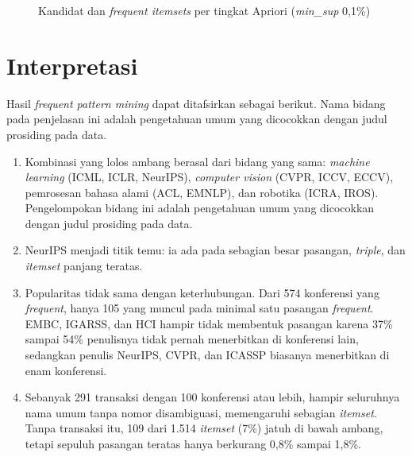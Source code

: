 \begin{figure}[!htb]
\centering
{}
\caption{Kandidat dan \textit{frequent itemsets} per tingkat Apriori (\textit{min\_sup} 0,1\%)}
\label{fig:t4-apriori-kandidat}
\end{figure}

\section{Interpretasi}
\label{sec:hasil-t4-interpretasi}
Hasil \textit{frequent pattern mining} dapat ditafsirkan sebagai berikut. Nama bidang pada penjelasan ini adalah pengetahuan umum yang dicocokkan dengan judul prosiding pada data.
\begin{enumerate}
\item Kombinasi yang lolos ambang berasal dari bidang yang sama: \textit{machine learning} (ICML, ICLR, NeurIPS), \textit{computer vision} (CVPR, ICCV, ECCV), pemrosesan bahasa alami (ACL, EMNLP), dan robotika (ICRA, IROS). Pengelompokan bidang ini adalah pengetahuan umum yang dicocokkan dengan judul prosiding pada data.
\item NeurIPS menjadi titik temu: ia ada pada sebagian besar pasangan, \textit{triple}, dan \textit{itemset} panjang teratas.
\item Popularitas tidak sama dengan keterhubungan. Dari 574 konferensi yang \textit{frequent}, hanya 105 yang muncul pada minimal satu pasangan \textit{frequent}. EMBC, IGARSS, dan HCI hampir tidak membentuk pasangan karena 37\% sampai 54\% penulisnya tidak pernah menerbitkan di konferensi lain, sedangkan penulis NeurIPS, CVPR, dan ICASSP biasanya menerbitkan di enam konferensi.
\item Sebanyak 291 transaksi dengan 100 konferensi atau lebih, hampir seluruhnya nama umum tanpa nomor disambiguasi, memengaruhi sebagian \textit{itemset}. Tanpa transaksi itu, 109 dari 1.514 \textit{itemset} (7\%) jatuh di bawah ambang, tetapi sepuluh pasangan teratas hanya berkurang 0,8\% sampai 1,8\%.
\end{enumerate}
